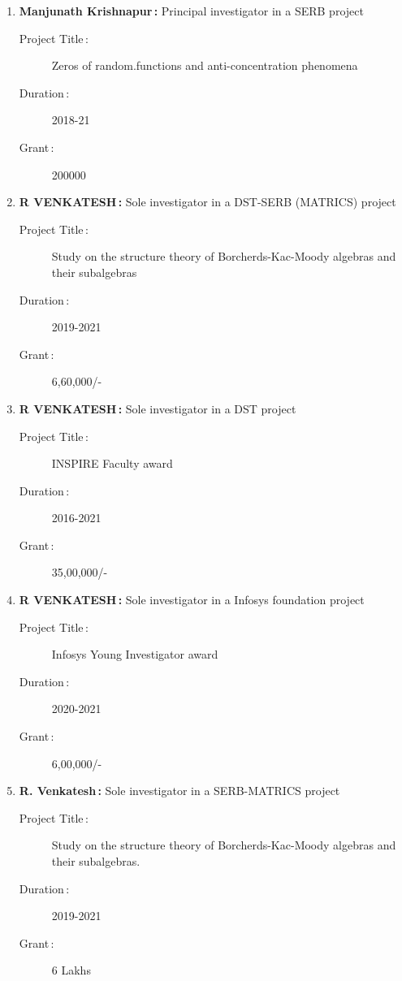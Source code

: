 \begin{enumerate}
\item {\bf Manjunath Krishnapur\,:} Principal investigator in a SERB project
\begin{description}
  \item[Project Title\,:] Zeros of random.functions and anti-concentration phenomena
  \item[Duration\,:] 2018-21
  \item[Grant\,:] 200000
\end{description}


\item {\bf R VENKATESH\,:} Sole investigator in a DST-SERB (MATRICS) project
\begin{description}
  \item[Project Title\,:] Study on the structure theory of Borcherds-Kac-Moody algebras and their subalgebras
  \item[Duration\,:] 2019-2021
  \item[Grant\,:] 6,60,000/-
\end{description}


\item {\bf R VENKATESH\,:} Sole investigator in a DST project
\begin{description}
  \item[Project Title\,:] INSPIRE Faculty award
  \item[Duration\,:] 2016-2021
  \item[Grant\,:] 35,00,000/-
\end{description}


\item {\bf R VENKATESH\,:} Sole investigator in a Infosys foundation project
\begin{description}
  \item[Project Title\,:] Infosys Young Investigator award
  \item[Duration\,:] 2020-2021
  \item[Grant\,:] 6,00,000/-
\end{description}


\item {\bf R. Venkatesh\,:} Sole investigator in a SERB-MATRICS project
\begin{description}
  \item[Project Title\,:] Study on the structure theory of Borcherds-Kac-Moody algebras and their subalgebras.
  \item[Duration\,:] 2019-2021
  \item[Grant\,:] 6 Lakhs
\end{description}



\end{enumerate}
